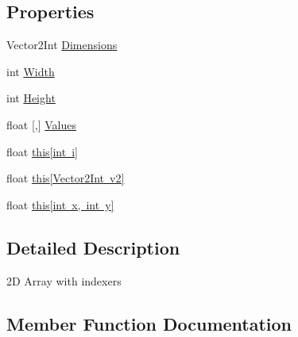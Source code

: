 \subsection*{Properties}
\begin{DoxyCompactItemize}
\item 
Vector2\+Int \mbox{\hyperlink{class_noise_map_aaa73317c8c0de24d323bd652fb93faee}{Dimensions}}
\item 
int \mbox{\hyperlink{class_noise_map_a0acc0f92acd8a77e9058c8ca446cf00a}{Width}}
\item 
int \mbox{\hyperlink{class_noise_map_af65841f7300d8b15bf3c6006246fca9e}{Height}}
\item 
float \mbox{[},\mbox{]} \mbox{\hyperlink{class_noise_map_a9ee9185c988152a2989feab0683ac664}{Values}}
\item 
float \mbox{\hyperlink{class_noise_map_a83be172bbaf8fcaad7bcc6b3b1ad9dbd}{this\mbox{[}int i\mbox{]}}}
\item 
float \mbox{\hyperlink{class_noise_map_aa0f8f5462a066a14667ea1269edc33bd}{this\mbox{[}\+Vector2\+Int v2\mbox{]}}}
\item 
float \mbox{\hyperlink{class_noise_map_aa32ffbd1bf29cf414b65e195dae5c221}{this\mbox{[}int x, int y\mbox{]}}}
\end{DoxyCompactItemize}


\subsection{Detailed Description}
2D Array with indexers 



\subsection{Member Function Documentation}
\mbox{\label{class_noise_map_a786377605734c7aec5c73905e0099780}} 
